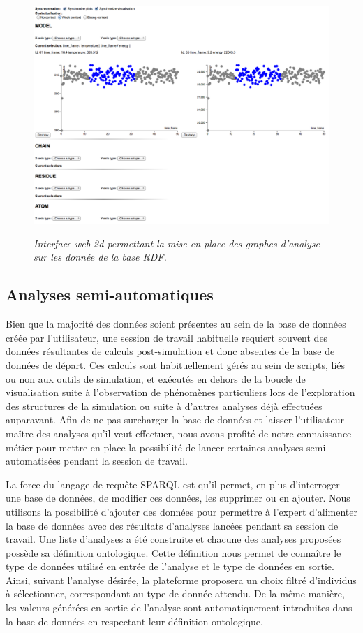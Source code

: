 \begin{figure}
  \centering
  {\includegraphics[width=1.0\linewidth]{./figures/ch5/2d_interface}}
    \caption{{\it Interface web 2d permettant la mise en place des graphes d'analyse sur les donnée de la base RDF.}}
  \label{Fig:multi_collaboratif}
  \hspace{0.3cm}
\end{figure}

\subsection{Analyses semi-automatiques}

Bien que la majorité des données soient présentes au sein de la base de données créée par l'utilisateur, une session de travail habituelle requiert souvent des données résultantes de calculs post-simulation et donc absentes de la base de données de départ. Ces calculs sont habituellement gérés au sein de scripts, liés ou non aux outils de simulation, et exécutés en dehors de la boucle de visualisation suite à l'observation de phénomènes particuliers lors de l'exploration des structures de la simulation ou suite à d'autres analyses déjà effectuées auparavant. Afin de ne pas surcharger la base de données et laisser l'utilisateur maître des analyses qu'il veut effectuer, nous avons profité de notre connaissance métier pour mettre en place la possibilité de lancer certaines analyses semi-automatisées pendant la session de travail. 

La force du langage de requête SPARQL est qu'il permet, en plus d'interroger une base de données, de modifier ces données, les supprimer ou en ajouter. Nous utilisons la possibilité d'ajouter des données pour permettre à l'expert d'alimenter la base de données avec des résultats d'analyses lancées pendant sa session de travail. Une liste d'analyses a été construite et chacune des analyses proposées possède sa définition ontologique. Cette définition nous permet de connaître le type de données utilisé en entrée de l'analyse et le type de données en sortie. Ainsi, suivant l'analyse désirée, la plateforme proposera un choix filtré d'individus à sélectionner, correspondant au type de donnée attendu. De la même manière, les valeurs générées en sortie de l'analyse sont automatiquement introduites dans la base de données en respectant leur définition ontologique.

